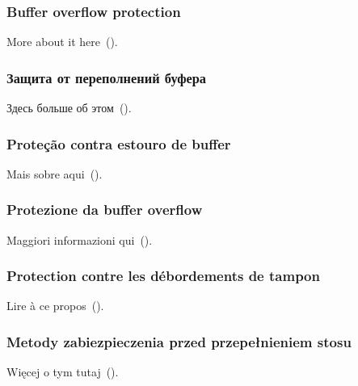 \ifdefined\ENGLISH
\subsubsection{Buffer overflow protection}

More about it here~().
\fi

\ifdefined\RUSSIAN
\subsubsection{Защита от переполнений буфера}

Здесь больше об этом~().
\fi

\ifdefined\BRAZILIAN
\subsubsection{Proteção contra estouro de buffer}

Mais sobre aqui~().
\fi

\ifdefined\ITALIAN
\subsubsection{Protezione da buffer overflow}

Maggiori informazioni qui~().
\fi

\ifdefined\FRENCH
\subsubsection{Protection contre les débordements de tampon}

Lire à ce propos~().
\fi


\ifdefined\POLISH
\subsubsection{Metody zabiezpieczenia przed przepełnieniem stosu}

Więcej o tym tutaj~().
\fi